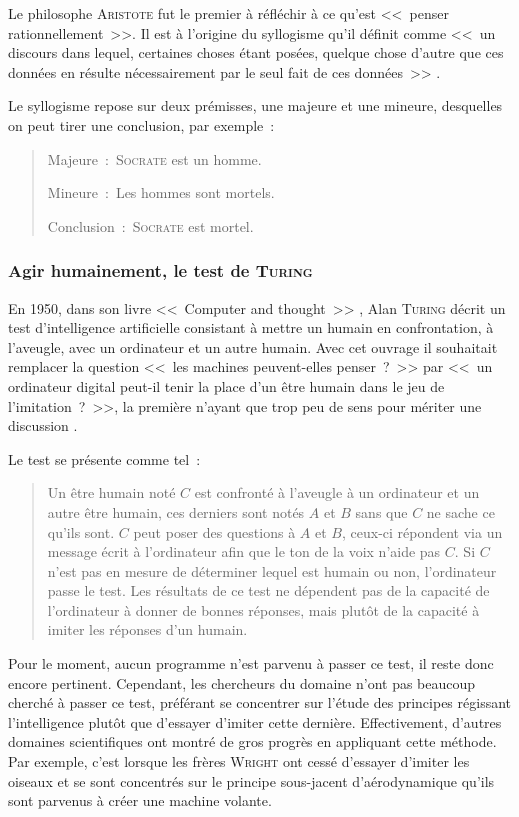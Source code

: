 Le philosophe \textsc{Aristote} fut le premier à réfléchir à ce qu'est <<~penser rationnellement~>>.
Il est à l'origine du syllogisme qu'il définit comme <<~un discours dans lequel, certaines choses étant posées, quelque chose d'autre que ces données en résulte nécessairement par le seul fait de ces données~>> \cite{aristote}.

Le syllogisme repose sur deux prémisses, une majeure et une mineure, desquelles on peut tirer une conclusion, par exemple~:~

\begin{quote}
    Majeure~:~\textsc{Socrate} est un homme.
    
    Mineure~:~Les hommes sont mortels.
    
    Conclusion~:~\textsc{Socrate} est mortel.
\end{quote}

\subsubsection{Agir humainement, le test de \textsc{Turing}}

En 1950, dans son livre <<~Computer and thought~>> \cite{computer_and_thought}, Alan \textsc{Turing} décrit un test d'intelligence artificielle consistant à mettre un humain en confrontation, à l’aveugle, avec un ordinateur et un autre humain.
Avec cet ouvrage il souhaitait remplacer la question <<~les machines peuvent-elles penser~?~>> par <<~un ordinateur digital peut-il tenir la place d'un être humain dans le jeu de l'imitation~?~>>, la première n'ayant que trop peu de sens pour mériter une discussion \cite{test_turing}.

Le test se présente comme tel~:~

\begin{quote}
    Un être humain noté $C$ est confronté à l'aveugle à un ordinateur et un autre être humain, ces derniers sont notés $A$ et $B$ sans que $C$ ne sache ce qu'ils sont.
    $C$ peut poser des questions à $A$ et $B$, ceux-ci répondent via un message écrit à l'ordinateur afin que le ton de la voix n'aide pas $C$.
    Si $C$ n'est pas en mesure de déterminer lequel est humain ou non, l'ordinateur passe le test.
    Les résultats de ce test ne dépendent pas de la capacité de l'ordinateur à donner de bonnes réponses, mais plutôt de la capacité à imiter les réponses d'un humain.
\end{quote}

Pour le moment, aucun programme n'est parvenu à passer ce test, il reste donc encore pertinent.
Cependant, les chercheurs du domaine n'ont pas beaucoup cherché à passer ce test, préférant se concentrer sur l'étude des principes régissant l'intelligence plutôt que d'essayer d'imiter cette dernière.
Effectivement, d'autres domaines scientifiques ont montré de gros progrès en appliquant cette méthode.
Par exemple, c'est lorsque les frères \textsc{Wright} ont cessé d'essayer d'imiter les oiseaux et se sont concentrés sur le principe sous-jacent d'aérodynamique qu'ils sont parvenus à créer une machine volante.

